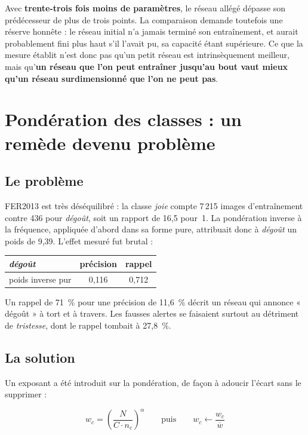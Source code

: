 \documentclass[a4paper,12pt]{report}
\begin{document}
Avec \textbf{trente-trois fois moins de paramètres}, le réseau allégé dépasse
son prédécesseur de plus de trois points. La comparaison demande toutefois une
réserve honnête : le réseau initial n'a jamais terminé son entraînement, et
aurait probablement fini plus haut s'il l'avait pu, sa capacité étant supérieure.
Ce que la mesure établit n'est donc pas qu'un petit réseau est intrinsèquement
meilleur, mais qu'\textbf{un réseau que l'on peut entraîner jusqu'au bout vaut
mieux qu'un réseau surdimensionné que l'on ne peut pas}.

\section{Pondération des classes : un remède devenu problème}

\subsection*{Le problème}
FER2013 est très déséquilibré : la classe \emph{joie} compte 7\,215 images
d'entraînement contre 436 pour \emph{dégoût}, soit un rapport de 16{,}5 pour~1.
La pondération inverse à la fréquence, appliquée d'abord dans sa forme pure,
attribuait donc à \emph{dégoût} un poids de 9{,}39. L'effet mesuré fut brutal :

\begin{center}
\begin{tabular}{lcc}
\hline
\emph{dégoût} & précision & rappel \\
\hline
poids inverse pur & 0{,}116 & 0{,}712 \\
\hline
\end{tabular}
\end{center}

Un rappel de 71~\% pour une précision de 11{,}6~\% décrit un réseau qui annonce
« dégoût » à tort et à travers. Les fausses alertes se faisaient surtout au
détriment de \emph{tristesse}, dont le rappel tombait à 27{,}8~\%.

\subsection*{La solution}
Un exposant a été introduit sur la pondération, de façon à adoucir l'écart sans
le supprimer :

\begin{equation}
w_c = \left(\frac{N}{C \cdot n_c}\right)^{\!\alpha}
\qquad\text{puis}\qquad
w_c \leftarrow \frac{w_c}{\overline{w}}
\end{equation}
\end{document}
